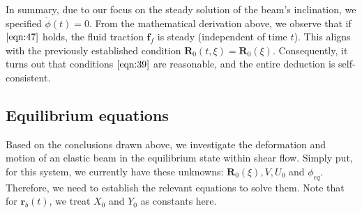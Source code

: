 \documentclass[12pt,MSc,twoside]{muthesis_2020}
\begin{document}
In summary, due to our focus on the steady solution of the beam's inclination, we specified $\dot{\phi}(t)=0$. From the mathematical derivation above, we observe that if $\eqref{eqn:47}$ holds, the fluid traction $\textbf{f}_{f}$ is steady (independent of time $t$). This aligns with the previously established condition $\textbf{R}_0(t,\xi)=\textbf{R}_0(\xi)$. Consequently, it turns out that conditions $\eqref{eqn:39}$ are reasonable, and the entire deduction is self-consistent.

\subsection{Equilibrium equations}
Based on the conclusions drawn above, we investigate the deformation and motion of an elastic beam in the equilibrium state within shear flow. Simply put, for this system, we currently have these unknowns: $\textbf{R}_0(\xi), V, U_0$ and $\phi_{eq}$. Therefore, we need to establish the relevant equations to solve them. Note that for $\textbf{r}_b(t)$, we treat $X_0$ and $Y_0$ as constants here.
\end{document}
